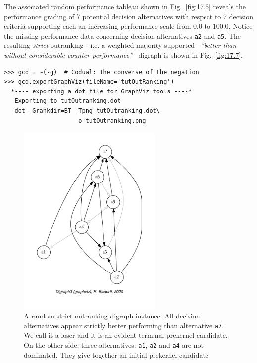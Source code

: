 The associated random performance tableau shown in Fig.~\vref{fig:17.6} reveals the performance grading of 7 potential decision alternatives with respect to 7 decision criteria supporting each an increasing performance scale from $0.0$ to $100.0$. Notice the missing performance data concerning decision alternatives \texttt{a2} and \texttt{a5}. The resulting \emph{strict} outranking - i.e. a weighted majority supported --\emph{``better than without considerable counter-performance''}-- digraph is shown in Fig.~\vref{fig:17.7}.
\begin{lstlisting}
>>> gcd = ~(-g)  # Codual: the converse of the negation
>>> gcd.exportGraphViz(fileName='tutOutRanking')
  *---- exporting a dot file for GraphViz tools ----*
   Exporting to tutOutranking.dot
   dot -Grankdir=BT -Tpng tutOutranking.dot\
                    -o tutOutranking.png\end{lstlisting}
\begin{figure}[h]
\sidecaption[t]
\includegraphics[width=7cm]{Figures/17-7-tutOutranking.pdf}
\caption{A random strict outranking digraph instance. All decision alternatives appear strictly better performing than alternative \texttt{a7}. We call it a \Condorcet loser and it is an evident terminal prekernel candidate. On the other side, three alternatives: \texttt{a1}, \texttt{a2} and \texttt{a4} are not dominated. They give together an initial prekernel candidate}
\label{fig:17.7}       %
\end{figure}

